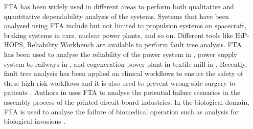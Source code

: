 \documentclass[10pt]{llncs}
\begin{document}
			
%

FTA has been widely used in different areas to perform both qualitative and quantitative dependability analysis of the systems. Systems that have been analysed using FTA include but not limited to propulsion systems on spacecraft, braking systems in cars, nuclear power plants, and so on. Different tools like HiP-HOPS\cite{Papadopoulos2012}, Reliability Workbench\cite{Isograph2014}  are available to perform fault tree analysis. FTA has been used to analyse the reliability of the power system in  \cite{volkanovski2009,cepin2011assessment}, power supply system to railways in  \cite{Chen2007}, and cogeneration power plant in textile mill in \cite{Ramesh2011}.  Recently, fault tree analysis has been applied on clinical workflows to ensure the safety of these high-risk workflows \cite{lamis2014} and it is also used to prevent wrong-side surgery to patients \cite{abecassis2015}. Authors in \cite{shu2006using} uses FTA to analyse the potential failure scenarios in the assembly process of the printed circuit board industries. In the biological domain, FTA is used to analyse the failure of biomedical operation such as analysis for biological invasions  \cite{hayes2002identifying}. 
 
\end{document}
